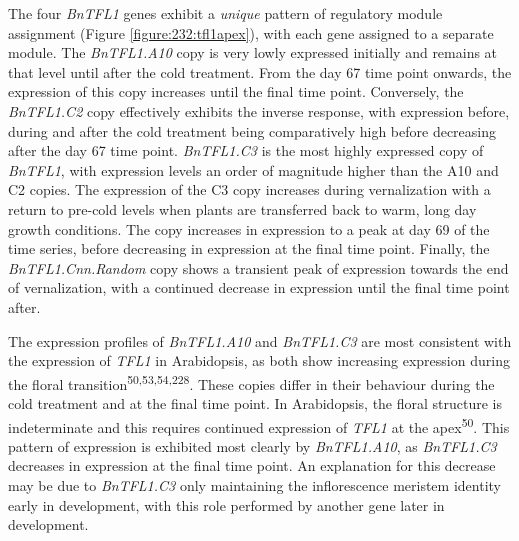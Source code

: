 \documentclass[12pt,]{book}
\begin{document}
The four \emph{BnTFL1} genes exhibit a \emph{unique} pattern of
regulatory module assignment (Figure \ref{figure:232:tfl1apex}), with
each gene assigned to a separate module. The \emph{BnTFL1.A10} copy is
very lowly expressed initially and remains at that level until after the
cold treatment. From the day 67 time point onwards, the expression of
this copy increases until the final time point. Conversely, the
\emph{BnTFL1.C2} copy effectively exhibits the inverse response, with
expression before, during and after the cold treatment being
comparatively high before decreasing after the day 67 time point.
\emph{BnTFL1.C3} is the most highly expressed copy of \emph{BnTFL1},
with expression levels an order of magnitude higher than the A10 and C2
copies. The expression of the C3 copy increases during vernalization
with a return to pre-cold levels when plants are transferred back to
warm, long day growth conditions. The copy increases in expression to a
peak at day 69 of the time series, before decreasing in expression at
the final time point. Finally, the \emph{BnTFL1.Cnn.Random} copy shows a
transient peak of expression towards the end of vernalization, with a
continued decrease in expression until the final time point after.

The expression profiles of \emph{BnTFL1.A10} and \emph{BnTFL1.C3} are
most consistent with the expression of \emph{TFL1} in Arabidopsis, as
both show increasing expression during the floral
transition\textsuperscript{50,53,54,228}. These copies differ in their
behaviour during the cold treatment and at the final time point. In
Arabidopsis, the floral structure is indeterminate and this requires
continued expression of \emph{TFL1} at the apex\textsuperscript{50}.
This pattern of expression is exhibited most clearly by
\emph{BnTFL1.A10}, as \emph{BnTFL1.C3} decreases in expression at the
final time point. An explanation for this decrease may be due to
\emph{BnTFL1.C3} only maintaining the inflorescence meristem identity
early in development, with this role performed by another gene later in
development.
\end{document}
